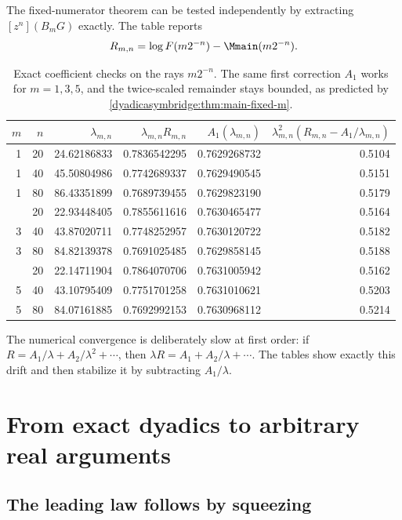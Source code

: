 \documentclass[11pt,oneside]{article}
\theoremstyle{definition}
\theoremstyle{remark}
\begin{document}
The fixed-numerator theorem can be tested independently by extracting
$[z^n](B_mG)$ exactly.  The table reports
\begin{equation}
 R_{m,n}=\log F(m2^{-n})-\Mmain(m2^{-n}).
\end{equation}

\begin{table}[htbp]
\centering
\small
\begin{tabular}{@{}rrrrrr@{}}
\toprule
$m$ & $n$ & $\lambda_{m,n}$ & $\lambda_{m,n}R_{m,n}$ &
$A_1(\lambda_{m,n})$ &
$\lambda_{m,n}^2(R_{m,n}-A_1/\lambda_{m,n})$\\
\midrule
1 & 20 & 24.62186833 & 0.7836542295 & 0.7629268732 & 0.5104\\
1 & 40 & 45.50804986 & 0.7742689337 & 0.7629490545 & 0.5151\\
1 & 80 & 86.43351899 & 0.7689739455 & 0.7629823190 & 0.5179\\
\addlinespace
3 & 20 & 22.93448405 & 0.7855611616 & 0.7630465477 & 0.5164\\
3 & 40 & 43.87020711 & 0.7748252957 & 0.7630120722 & 0.5182\\
3 & 80 & 84.82139378 & 0.7691025485 & 0.7629858145 & 0.5188\\
\addlinespace
5 & 20 & 22.14711904 & 0.7864070706 & 0.7631005942 & 0.5162\\
5 & 40 & 43.10795409 & 0.7751701258 & 0.7631010621 & 0.5203\\
5 & 80 & 84.07161885 & 0.7692992153 & 0.7630968112 & 0.5214\\
\bottomrule
\end{tabular}
\caption{Exact coefficient checks on the rays $m2^{-n}$.  The same first correction
$A_1$ works for $m=1,3,5$, and the twice-scaled remainder stays bounded, as predicted by
\cref{dyadicasymbridge:thm:main-fixed-m}.}
\label{dyadicasymbridge:tab:fixed-m-numerics}
\end{table}

The numerical convergence is deliberately slow at first order: if
$R=A_1/\lambda+A_2/\lambda^2+\cdots$, then
$\lambda R=A_1+A_2/\lambda+\cdots$.  The tables show exactly this drift and then stabilize it by subtracting $A_1/\lambda$.

\section{From exact dyadics to arbitrary real arguments}
\label{dyadicasymbridge:sec:dedydadicization}

\subsection{The leading law follows by squeezing}
\end{document}

